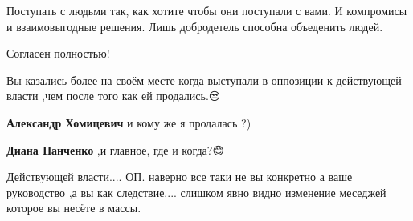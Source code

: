 \begin{itemize}
Поступать с людьми так, как хотите чтобы они поступали с вами. И компромисы и
взаимовыгодные решения. Лишь добродетель способна объеденить людей.

\begin{itemize}
 
Согласен полностью!
\end{itemize}

 
Вы казались более на своём месте когда выступали в оппозиции к действующей
власти ,чем после того как ей продались.😒

\begin{itemize}

 
\textbf{Александр Хомицевич} и кому же я продалась ?)

 
\textbf{Диана Панченко} ,и главное, где и когда?😊

 

Действующей власти.... ОП. наверно все таки не вы конкретно а ваше руководство ,а
вы как следствие.... слишком явно видно изменение меседжей которое вы несёте в
массы.


 

\end{itemize}
\end{itemize}
